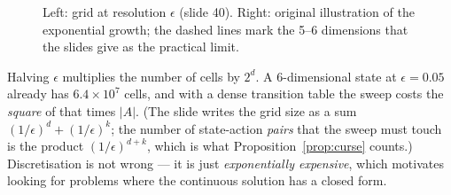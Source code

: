 \documentclass[11pt,a4paper]{article}
\theoremstyle{plain}
\theoremstyle{definition}
\theoremstyle{remark}
\begin{document}
\begin{figure}[H]
\centering
\begin{minipage}{0.4\linewidth}
\centering
{}
\end{minipage}\hfill
\begin{minipage}{0.58\linewidth}
\centering
{}
\end{minipage}
\caption{Left: grid at resolution $\epsilon$ (slide 40). Right: original illustration of the exponential growth; the dashed lines mark the 5--6 dimensions that the slides give as the practical limit.}
\end{figure}

\begin{intuition}
Halving $\epsilon$ multiplies the number of cells by $2^d$. A 6-dimensional state at $\epsilon=0.05$ already has $6.4\times10^7$ cells, and with a dense transition table the sweep costs the \emph{square} of that times $|A|$. (The slide writes the grid size as a sum $(1/\epsilon)^d+(1/\epsilon)^k$; the number of state-action \emph{pairs} that the sweep must touch is the product $(1/\epsilon)^{d+k}$, which is what Proposition~\ref{prop:curse} counts.) Discretisation is not wrong --- it is just \emph{exponentially expensive}, which motivates looking for problems where the continuous solution has a closed form.
\end{intuition}

\end{document}
